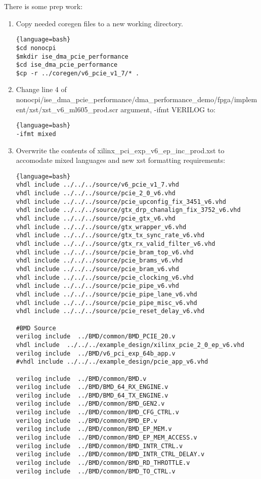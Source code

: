 There is some prep work:
\begin{enumerate}

\item Copy needed coregen files to a new working directory.
\begin{lstlisting}{language=bash}
$cd nonocpi
$mkdir ise_dma_pcie_performance
$cd ise_dma_pcie_performance
$cp -r ../coregen/v6_pcie_v1_7/* .
\end{lstlisting}

\item Change line 4 of nonocpi/ise\_dma\_pcie\_performance/dma\_performance\_demo/fpga/implement/xst/xst\_v6\_ml605\_prod.scr argument, -ifmt VERILOG to:
\begin{lstlisting}{language=bash}
-ifmt mixed
\end{lstlisting}

\item Overwrite the contents of xilinx\_pci\_exp\_v6\_ep\_inc\_prod.xst to accomodate mixed languages and new xst formatting requirements:
\begin{lstlisting}{language=bash}
vhdl include ../../../source/v6_pcie_v1_7.vhd
vhdl include ../../../source/pcie_2_0_v6.vhd
vhdl include ../../../source/pcie_upconfig_fix_3451_v6.vhd
vhdl include ../../../source/gtx_drp_chanalign_fix_3752_v6.vhd
vhdl include ../../../source/pcie_gtx_v6.vhd
vhdl include ../../../source/gtx_wrapper_v6.vhd
vhdl include ../../../source/gtx_tx_sync_rate_v6.vhd
vhdl include ../../../source/gtx_rx_valid_filter_v6.vhd
vhdl include ../../../source/pcie_bram_top_v6.vhd
vhdl include ../../../source/pcie_brams_v6.vhd
vhdl include ../../../source/pcie_bram_v6.vhd
vhdl include ../../../source/pcie_clocking_v6.vhd
vhdl include ../../../source/pcie_pipe_v6.vhd
vhdl include ../../../source/pcie_pipe_lane_v6.vhd
vhdl include ../../../source/pcie_pipe_misc_v6.vhd
vhdl include ../../../source/pcie_reset_delay_v6.vhd

#BMD Source
verilog include  ../BMD/common/BMD_PCIE_20.v
vhdl include  ../../../example_design/xilinx_pcie_2_0_ep_v6.vhd
verilog include  ../BMD/v6_pci_exp_64b_app.v
#vhdl include ../../../example_design/pcie_app_v6.vhd

verilog include  ../BMD/common/BMD.v
verilog include  ../BMD/BMD_64_RX_ENGINE.v
verilog include  ../BMD/BMD_64_TX_ENGINE.v
verilog include  ../BMD/common/BMD_GEN2.v
verilog include  ../BMD/common/BMD_CFG_CTRL.v
verilog include  ../BMD/common/BMD_EP.v
verilog include  ../BMD/common/BMD_EP_MEM.v
verilog include  ../BMD/common/BMD_EP_MEM_ACCESS.v
verilog include  ../BMD/common/BMD_INTR_CTRL.v
verilog include  ../BMD/common/BMD_INTR_CTRL_DELAY.v
verilog include  ../BMD/common/BMD_RD_THROTTLE.v
verilog include  ../BMD/common/BMD_TO_CTRL.v
\end{lstlisting}


\end{enumerate}
